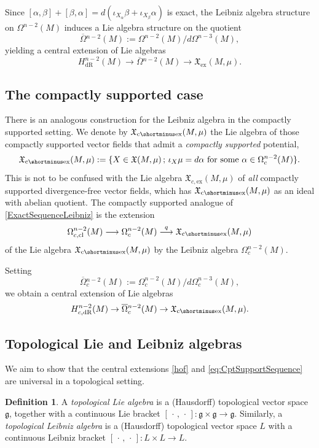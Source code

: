 \documentclass{article}
\newcommand{\ex}{\mathrm{ex}}
\newcommand{\dR}{\mathrm{dR}}
\newcommand{\cl}{\mathrm{cl}}
\newcommand{\fX}{\mathfrak{X}}
\newcommand{\oline}{\overline}
\newcommand{\ceX}{\fX_{\mathrm{c}\shortminus\mathrm{ex}}}
\theoremstyle{definition}
\newtheorem{Definition}[Theorem]{Definition}
\begin{document}
Since $[\alpha, \beta] + [\beta, \alpha] = d(\iota_{X_{\alpha}}\beta + \iota_{X_{\beta}}\alpha)$ is exact, 
the Leibniz algebra structure on ${\Omega^{n-2}(M)}$ induces a 
Lie algebra structure on the quotient
\[ \oline{\Omega}{}^{n-2}(M) := {\Omega^{n-2}(M)}/{d\Omega^{n-3}(M)},\]
yielding a central extension of Lie algebras
\begin{equation}\label{hof}
H^{n-2}_{\dR}(M) \rightarrow \oline{\Omega}{}^{n-2}(M) 
\rightarrow \fX_{\ex}(M,\mu).
\end{equation}




\subsection{The compactly supported case}
There is an analogous construction for the Leibniz algebra in the compactly supported setting.
We denote by $\ceX(M,\mu)$
the Lie algebra of those compactly supported vector fields that 
admit a \emph{compactly supported} potential, 
\[
	\ceX(M, \mu) := \{X \in \fX(M,\mu) \,;\, \iota_{X}\mu = d\alpha \text{ for some } \alpha \in \Omega_{c}^{n-2}(M)\}.
\]
This is not to be confused with the Lie algebra $\fX_{c, \ex}(M,\mu)$ of \emph{all} compactly supported divergence-free vector fields, which has
$\ceX(M,\mu)$ as an ideal with abelian quotient.
The compactly supported analogue of \eqref{ExactSequenceLeibniz} is the extension 
\begin{equation}\label{qq}
\Omega^{n-2}_{c,\cl}(M)\longrightarrow \Omega^{n-2}_c(M)\stackrel{q}{\longrightarrow} \ceX(M,\mu)
\end{equation}
of the Lie algebra $\ceX(M,\mu)$
by the Leibniz algebra $\Omega^{n-2}_c(M)$. 

Setting
\[ \oline{\Omega}{}^{n-2}_c(M) := {\Omega^{n-2}_c(M)}/{d\Omega^{n-3}_c(M)},\]
we obtain a central extension  of Lie algebras
\begin{equation}\label{eq:CptSupportSequence}
H^{n-2}_{c, \dR}(M) \rightarrow \oline{\Omega}{}_{c}^{n-2}(M)
\rightarrow \ceX(M,\mu).
\end{equation}

\subsection{Topological Lie and Leibniz algebras}
We aim to show that the central extensions \eqref{hof} and \eqref{eq:CptSupportSequence} are universal in a topological setting.


\begin{Definition}
A \emph{topological Lie algebra} is a (Hausdorff) 
topological vector space $\mathfrak{g}$, together with a continuous Lie  bracket
$[\,\cdot\,,\,\cdot\,]\colon \mathfrak{g} \times \mathfrak{g} \rightarrow \mathfrak{g}$.
Similarly, a \emph{topological Leibniz algebra} is a (Hausdorff) topological vector space $L$ with a continuous Leibniz 
bracket $[\,\cdot\,,\,\cdot\,]\colon L \times L \rightarrow L$.
\end{Definition}
\end{document}
